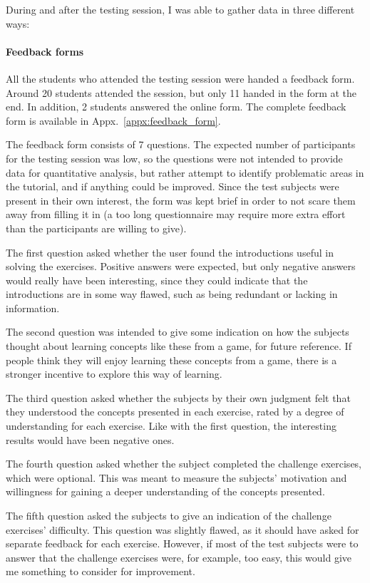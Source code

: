 \noindent
During and after the testing session, I was able to gather data in three different ways:

\paragraph{Feedback forms} All the students who attended the testing session were handed a feedback form. Around 20 students attended the session, but only 11 handed in the form at the end. In addition, 2 students answered the online form. The complete feedback form is available in Appx.~\ref{appx:feedback_form}.

\noindent
The feedback form consists of 7 questions. The expected number of participants for the testing session was low, so the questions were not intended to provide data for quantitative analysis, but rather attempt to identify problematic areas in the tutorial, and if anything could be improved. Since the test subjects were present in their own interest, the form was kept brief in order to not scare them away from filling it in (a too long questionnaire may require more extra effort than the participants are willing to give).

\noindent
The first question asked whether the user found the introductions useful in solving the exercises. Positive answers were expected, but only negative answers would really have been interesting, since they could indicate that the introductions are in some way flawed, such as being redundant or lacking in information.

\noindent
The second question was intended to give some indication on how the subjects thought about learning concepts like these from a game, for future reference. If people think they will enjoy learning these concepts from a game, there is a stronger incentive to explore this way of learning.

\noindent
The third question asked whether the subjects by their own judgment felt that they understood the concepts presented in each exercise, rated by a degree of understanding for each exercise. Like with the first question, the interesting results would have been negative ones.

\noindent
The fourth question asked whether the subject completed the challenge exercises, which were optional. This was meant to measure the subjects' motivation and willingness for gaining a deeper understanding of the concepts presented.

\noindent
The fifth question asked the subjects to give an indication of the challenge exercises' difficulty. This question was slightly flawed, as it should have asked for separate feedback for each exercise. However, if most of the test subjects were to answer that the challenge exercises were, for example, too easy, this would give me something to consider for improvement.

